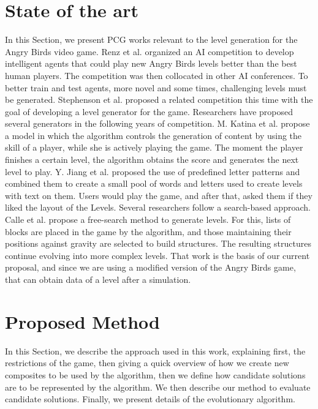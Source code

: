 \documentclass[conference]{IEEEtran}
\begin{document}
\section{State of the art}
\label{SoA}
In this Section, we present PCG works relevant to the level generation for
the Angry Birds video game. Renz et al. \cite{Renz, Renz2015TheAB} organized
an AI competition to develop intelligent agents that could play new  Angry
Birds levels better than the best human players. The competition was then
collocated in other AI conferences. To better train and test agents, more
novel and some times, challenging levels must be generated. Stephenson et
al. proposed a related competition this time with the goal of developing a
level generator for the game. Researchers have proposed several generators
in the following years of competition. M. Katina et al.  \cite{Kaidan2015}
propose a model in which the algorithm controls the generation of content by
using the skill of a player, while she is actively playing the game. The
moment the player finishes a certain level, the algorithm obtains the score
and generates the next level to play. Y. Jiang et al. \cite{Jiang2017}
proposed the use of predefined letter patterns and combined them to create a
small pool of words and letters used to create levels with text on them.
Users would play the game, and after that,   asked them if they liked the
layout of the Levels.  Several researchers follow a search-based approach.
Calle et al. \cite{lauracalle} propose a free-search method to generate
levels.  For this, lists of blocks are placed in the game by the algorithm,
and those maintaining their positions against gravity are selected to build
structures. The resulting structures continue evolving into more complex
levels. That work is the basis of our current proposal, and since we are
using a modified version of the Angry Birds game, that can obtain data of a
level after a simulation.
    
    \section{Proposed Method}
    \label{prop_method}  

In this Section, we describe the approach used in this work, explaining
first, the restrictions of the game, then giving a quick overview of how we
create new composites to be used by the algorithm, then we define how candidate
solutions are to be represented by the algorithm. We then describe our method to
evaluate candidate solutions. Finally, we present details of the evolutionary
algorithm. 
\end{document}
